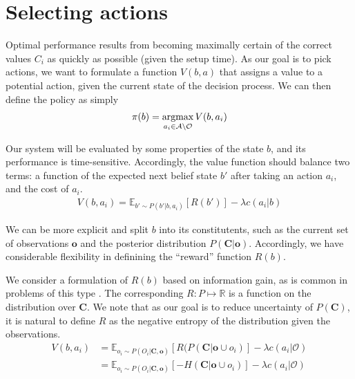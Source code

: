 \section{Selecting actions} \label{sec:value}
Optimal performance results from becoming maximally certain of the correct values $C_i$ as quickly as possible (given the setup time).
As our goal is to pick actions, we want to formulate a function $V(b,a)$  that assigns a value to a potential action, given the current state of the decision process.
We can then define the policy as simply
\begin{align}
\pi(b) = \argmax_{a_i \in \mathcal{A} \setminus \mathcal{O}} V(b,a_i)
\end{align}

Our system will be evaluated by some properties of the state $b$, and its performance is time-sensitive.
Accordingly, the value function should balance two terms: a function of the expected next belief state $b'$ after taking an action $a_i$, and the cost of $a_i$.
\begin{align}
V(b,a_i) = \mathbb{E}_{b' \sim P(b'|b,a_i)}[R(b')] - \lambda c(a_i|b)
\end{align}

We can be more explicit and split $b$ into its constitutents, such as the current set of observations $\mathbf{o}$ and the posterior distribution $P(\mathbf{C}|\mathbf{o})$.
Accordingly, we have considerable flexibility in definining the ``reward'' function $R(b)$.

We consider a formulation of $R(b)$ based on information gain, as is common in problems of this type .
The corresponding $R: P \mapsto \mathbb{R}$ is a function on the distribution over $\mathbf{C}$.
We note that as our goal is to reduce uncertainty of $P(\mathbf{C})$, it is natural to define $R$ as the negative entropy of the distribution given the observations.
\begin{align}
V(b,a_i)
&= \mathbb{E}_{o_i \sim P(O_i|\mathbf{C},\mathbf{o})}[R(P(\mathbf{C}|\mathbf{o} \cup o_i)] - \lambda c(a_i|\mathcal{O}) \\
&= \mathbb{E}_{o_i \sim P(O_i|\mathbf{C},\mathbf{o})}[-H(\mathbf{C}|\mathbf{o} \cup o_i)] - \lambda c(a_i|\mathcal{O})
\end{align}

